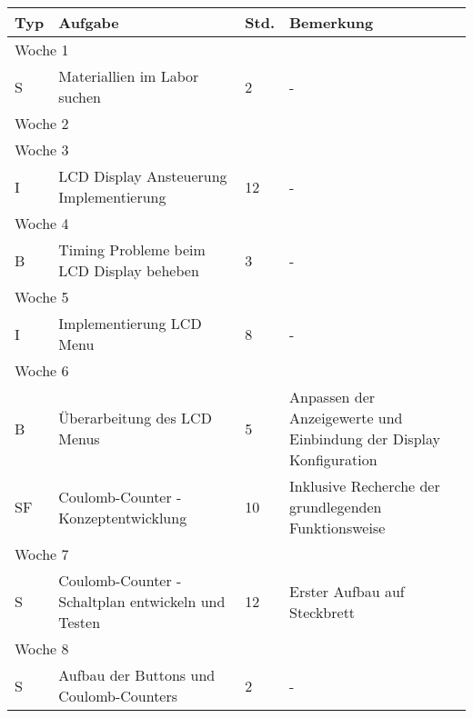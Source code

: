 \vspace{1em}
\begin{table}[!hp]
    \begin{center}
        \begin{tabular}{|p{0.8cm}|p{6cm}|p{0.8cm}|p{8cm}|} \hline           
        \textbf{Typ} & \textbf{Aufgabe} & \textbf{Std.} & \textbf{Bemerkung} \\ \hline

        \multicolumn{4}{|l|}{Woche 1}                                                            \\ \hline
        S           &  Materiallien im Labor suchen & 2 & - \\ \hline
        \multicolumn{4}{|l|}{Woche 2}                                                            \\ \hline
        \multicolumn{4}{|l|}{Woche 3}                                                            \\ \hline
        I & LCD Display Ansteuerung Implementierung & 12 & - \\ \hline
        \multicolumn{4}{|l|}{Woche 4}                                                            \\ \hline
        B & Timing Probleme beim LCD Display beheben & 3 & - \\ \hline        
        \multicolumn{4}{|l|}{Woche 5}                                                            \\ \hline
        I & Implementierung LCD Menu & 8 & - \\ \hline
        \multicolumn{4}{|l|}{Woche 6}                                                            \\ \hline
        B & Überarbeitung des LCD Menus & 5 & Anpassen der Anzeigewerte und Einbindung der Display Konfiguration \\ 
        SF & Coulomb-Counter - Konzeptentwicklung & 10 & Inklusive Recherche der grundlegenden Funktionsweise \\ \hline
        \multicolumn{4}{|l|}{Woche 7}                                                            \\ \hline
        S & Coulomb-Counter - Schaltplan entwickeln und Testen & 12 & Erster Aufbau auf Steckbrett \\ \hline
        \multicolumn{4}{|l|}{Woche 8}                                                            \\ \hline
        S & Aufbau der Buttons und Coulomb-Counters & 2 & - \\

\end{tabular}
\end{center}
\end{table}
